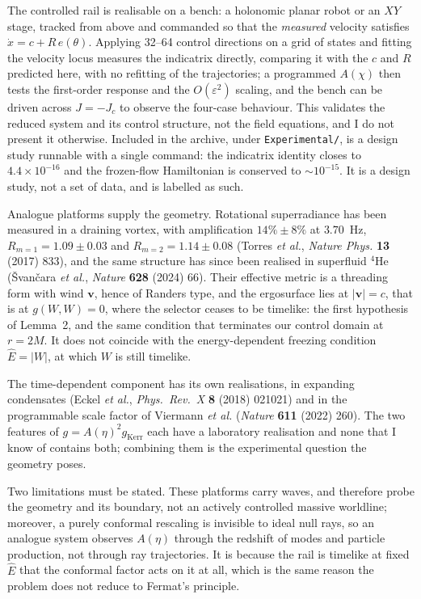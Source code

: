 \documentclass{article}
\begin{document}
The controlled rail is realisable on a bench: a holonomic planar robot or an \(XY\)
stage, tracked from above and commanded so that the \emph{measured} velocity
satisfies \(\dot x = c + R\,e(\theta)\). Applying 32--64 control directions on a grid
of states and fitting the velocity locus measures the indicatrix directly, comparing
it with the \(c\) and \(R\) predicted here, with no refitting of the trajectories; a
programmed \(A(\chi)\) then tests the first-order response and the
\(O(\varepsilon^2)\) scaling, and the bench can be driven across \(J =-J_c\) to
observe the four-case behaviour. This validates the reduced system and its control
structure, not the field equations, and I do not present it otherwise. Included in
the archive, under \texttt{Experimental/}, is a design study runnable with a single
command: the indicatrix identity closes to \(4.4 \times 10^{-16}\) and the
frozen-flow Hamiltonian is conserved to \(\sim 10^{-15}\). It is a design study, not
a set of data, and is labelled as such.

Analogue platforms supply the geometry. Rotational superradiance has been measured
in a draining vortex, with amplification \(14\%\pm 8\%\) at \(3.70\)~Hz,
\(R_{m=1} = 1.09\pm 0.03\) and \(R_{m=2} = 1.14\pm 0.08\) (Torres \emph{et al.},
\emph{Nature Phys.} \textbf{13} (2017) 833), and the same structure has since been
realised in superfluid \(^4\)He (\v{S}van\v{c}ara \emph{et al.}, \emph{Nature}
\textbf{628} (2024) 66). Their effective metric is a threading form with wind
\(\boldsymbol v\), hence of Randers type, and the ergosurface lies at
\(|\boldsymbol{v}| = c\), that is at \(g(W,W) = 0\), where the selector ceases to be
timelike: the first hypothesis of Lemma~2, and the same condition that terminates
our control domain at \(r = 2M\). It does not coincide with the energy-dependent
freezing condition \(\hat E = |W|\), at which \(W\) is still timelike.

The time-dependent component has its own realisations, in expanding condensates
(Eckel \emph{et al.}, \emph{Phys.\ Rev.\ X} \textbf{8} (2018) 021021) and in the
programmable scale factor of Viermann \emph{et al.} (\emph{Nature} \textbf{611}
(2022) 260). The two features of \(g = A(\eta)^2g_{\text{Kerr}}\) each have a
laboratory realisation and none that I know of contains both; combining them is the
experimental question the geometry poses.

Two limitations must be stated. These platforms carry waves, and therefore probe the
geometry and its boundary, not an actively controlled massive worldline; moreover, a
purely conformal rescaling is invisible to ideal null rays, so an analogue system
observes \(A(\eta)\) through the redshift of modes and particle production, not
through ray trajectories. It is because the rail is timelike at fixed \(\hat E\)
that the conformal factor acts on it at all, which is the same reason the problem
does not reduce to Fermat's principle.
\end{document}

